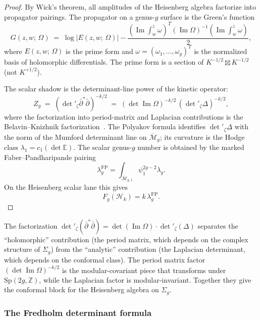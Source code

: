 \begin{proof}
By Wick's theorem, all amplitudes of the Heisenberg algebra factorize into propagator pairings. The propagator on a genus-$g$ surface is the Green's function
\begin{equation}%
G(z,w;\,\Omega) \;=\; \log|E(z,w;\,\Omega)| - \frac{(\operatorname{Im}\int_w^z \omega)^T (\operatorname{Im}\Omega)^{-1} (\operatorname{Im}\int_w^z \omega)}{2},
\end{equation}
where $E(z,w;\,\Omega)$ is the prime form and $\omega = (\omega_1, \ldots, \omega_g)^T$ is the normalized basis of holomorphic differentials. The prime form is a section of $K^{-1/2} \boxtimes K^{-1/2}$ (not $K^{+1/2}$).

The scalar shadow is the determinant-line power of the kinetic
operator:
\[
Z_g \;=\; (\det{}'_\zeta \bar{\partial}^*\bar{\partial})^{-k/2} \;=\; (\det\operatorname{Im}\Omega)^{-k/2}\, (\det{}'_\zeta \Delta)^{-k/2},
\]
where the factorization into period-matrix and Laplacian contributions is the Belavin--Knizhnik factorization~\cite{BK86}. The Polyakov formula identifies $\det{}'_\zeta \Delta$ with the norm of the Mumford determinant line on $\overline{\mathcal{M}}_g$; its curvature is the Hodge class $\lambda_1=c_1(\det\mathbb{E})$. The scalar genus-$g$ number is obtained by the marked Faber--Pandharipande pairing
\[
\lambda_g^{\mathrm{FP}}
=\int_{\overline{\mathcal{M}}_{g,1}}\psi_1^{2g-2}\lambda_g.
\]
On the Heisenberg scalar lane this gives
\[
F_g(\mathcal{H}_k) = k\,\lambda_g^{\mathrm{FP}}.
\]
\end{proof}

\begin{remark}
The factorization $\det{}'_\zeta(\bar\partial^*\bar\partial) = \det(\operatorname{Im}\Omega) \cdot \det{}'_\zeta(\Delta)$ separates the ``holomorphic'' contribution (the period matrix, which depends on the complex structure of $\Sigma_g$) from the ``analytic'' contribution (the Laplacian determinant, which depends on the conformal class). The period matrix factor $(\det\operatorname{Im}\Omega)^{-k/2}$ is the modular-covariant piece that transforms under $\mathrm{Sp}(2g,\mathbb{Z})$, while the Laplacian factor is modular-invariant. Together they give the conformal block for the Heisenberg algebra on $\Sigma_g$.
\end{remark}

\subsubsection{The Fredholm determinant formula}

